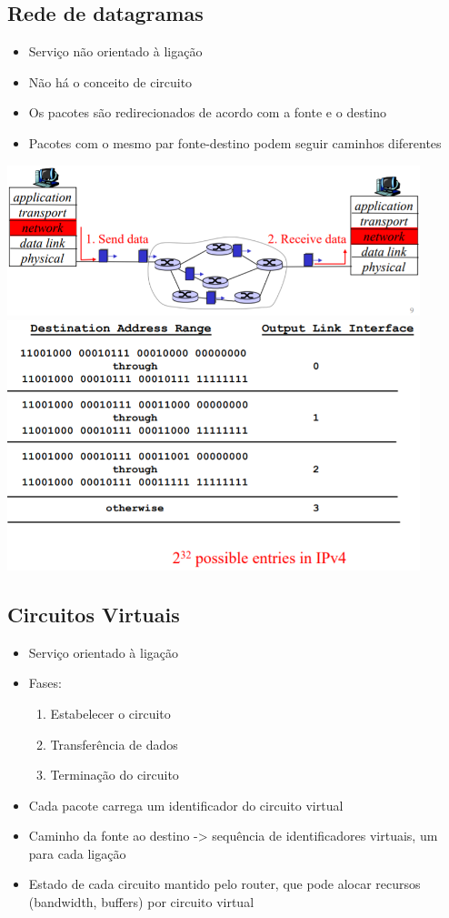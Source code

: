 \documentclass[../resumosRCOM.tex]{subfiles}
\begin{document}
\subsection{Rede de datagramas}
\begin{itemize}
    \item Serviço não orientado à ligação
	\item Não há o conceito de circuito
	\item Os pacotes são redirecionados de acordo com a fonte e o destino
	\item Pacotes com o mesmo par fonte-destino podem seguir caminhos diferentes
\end{itemize}
\begin{center}            
    \includegraphics[width=12cm]{images/RCOM2.png}
    \includegraphics[width=12cm]{images/RCOM3.png}
\end{center}

\subsection{Circuitos Virtuais}
\begin{itemize}
    \item Serviço orientado à ligação
	\item Fases:
	\begin{enumerate}
	    \item Estabelecer o circuito
		\item Transferência de dados
		\item Terminação do circuito
	\end{enumerate}
	\item Cada pacote carrega um identificador do circuito virtual
    \item Caminho da fonte ao destino -> sequência de identificadores virtuais, um para cada ligação
	\item Estado de cada circuito mantido pelo router, que pode alocar recursos (bandwidth, buffers) por circuito virtual
\end{itemize}
\end{document}
